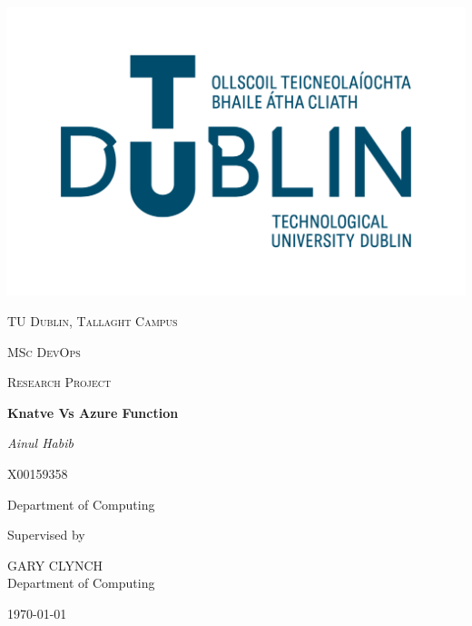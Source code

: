 \documentclass[12pt]{article}
\begin{document}
\thispagestyle{empty}
\setlength\headheight{0pt} 
\begin{center}

\begin{center}
\includegraphics[width=0.65\linewidth]{images/TUD_Logo.png}            
\end{center}	

        \vspace{0.25cm}
        {\scshape\LARGE TU Dublin, Tallaght Campus \par}
        \vspace{0.25cm}
        {\scshape\Large MSc DevOps\par}
        {\scshape\Large Research Project }
        \vspace{0.5cm}

        {\Large\bfseries Knatve Vs Azure Function\par}
        
        \vspace{0.5cm}
        {\Large\itshape Ainul Habib\par}
        {\scshape\small X00159358 \par}
        Department of Computing
        \vspace{0.25cm}

\vspace{1cm}
Supervised by\par
GARY CLYNCH \\
Department of Computing\par
\vspace{1.5cm}
\large
\today

\end{center}

\clearpage
\restoregeometry
\justify
\end{document}
